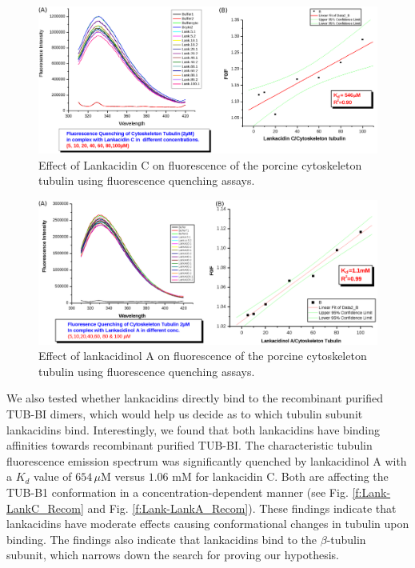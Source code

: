 \documentclass[11pt]{report}
\begin{document}
\begin{figure}
\centering
\includegraphics[width=1.0\linewidth]{images/LankC_PorcCyto.pdf}
\caption[Effect of lankacidin C on fluorescence of the porcine cytoskeleton tubulin]{ 
Effect of Lankacidin C on fluorescence of the porcine cytoskeleton tubulin using fluorescence
quenching assays.}
\label{f:Lank-LankC_PorcCyto}
\end{figure}

\begin{figure}
\centering
\includegraphics[width=1.0\linewidth]{images/LankA_PorcCyto.pdf}
\caption[Effect of lankacidinol A on fluorescence of the porcine cytoskeleton tubulin]{
Effect of lankacidinol A on fluorescence of the porcine cytoskeleton tubulin using fluorescence
quenching assays.}
\label{f:Lank-LankA_PorcCyto}
\end{figure}

We also tested whether lankacidins directly bind to the recombinant purified TUB-BI dimers, which would help us decide as to which tubulin subunit
lankacidins bind. Interestingly, we found that both lankacidins have binding affinities towards recombinant purified TUB-BI. 
The characteristic tubulin fluorescence emission spectrum was significantly quenched by lankacidinol A with a $K_d$ value of $654\,\mu$M versus $1.06$ mM for lankacidin C. Both are affecting the TUB-B1 conformation in a concentration-dependent manner
(see Fig. \ref{f:Lank-LankC_Recom} and Fig. \ref{f:Lank-LankA_Recom}).
These findings indicate that lankacidins have moderate effects causing
conformational changes in tubulin upon binding.
The findings also indicate that lankacidins bind to the $\beta$-tubulin
subunit, which narrows down the search for proving our hypothesis.
\end{document}
